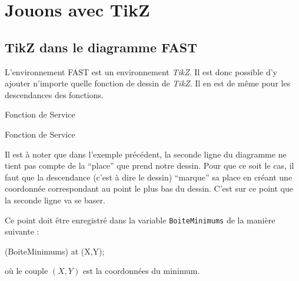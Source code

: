 \section{Jouons avec TikZ\label{tikzz}}



	\subsection{TikZ dans le diagramme FAST}\label{tikzpartout}

		L'environnement FAST est un environnement \emph{TikZ}.
		Il est donc possible d'y ajouter n'importe quelle fonction de dessin de \emph{TikZ}.
		Il en est de même pour les descendances des fonctions.
\begin{code}
\begin{fast}{Fonction de Service}
\end{fast}
\end{code}
		\cqd
\begin{exemple}
\begin{fast}{Fonction de Service}
\end{fast}
\end{exemple}

		Il est à noter que dans l'exemple précédent, la seconde ligne du diagramme ne tient pas compte de la ``place'' que prend notre dessin.
		Pour que ce soit le cas, il faut que la descendance (c'est à dire le dessin) ``marque'' sa place en créant une coordonnée correspondant au point le plus bas du dessin.
		C'est sur ce point que la seconde ligne va se baser.

		Ce point doit être enregistré dans la variable {\color{blue}\verb'BoiteMinimums'} de la manière suivante :
\begin{code}
\coordinate (BoiteMinimums) at (X,Y);
\end{code}
		où le couple $(X, Y)$ est la coordonnées du minimum.

